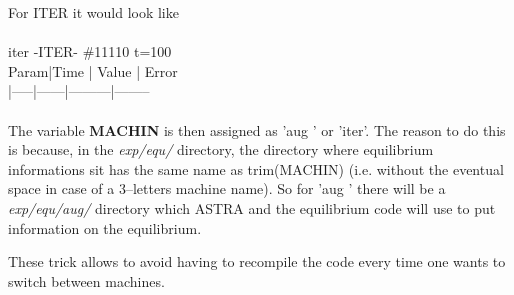 For ITER it would look like \\\\
iter -ITER- \#11110 t=100 \\
 Param|Time  |  Value  |   Error \\
|-----|------|---------|-------- \\ \\

The variable {\bf MACHIN} is then assigned as 'aug ' or 'iter'.
The reason to do this is because, in the {\it exp/equ/} directory, the directory where equilibrium informations sit has the 
same name as trim(MACHIN) (i.e. without the eventual space in case of a 3--letters machine name). So for 'aug ' there 
will be a {\it exp/equ/aug/} directory which ASTRA and the equilibrium code will use to put information on the equilibrium.

These trick allows to avoid having to recompile the code every time one wants to switch between machines.







\clearpage





